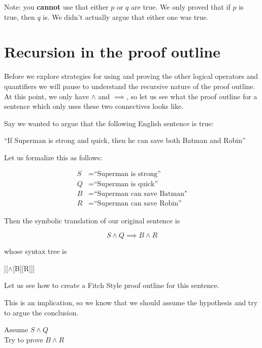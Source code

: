 Note:  you \textbf{cannot} use that either $p$ or $q$ are true.  We only proved that if $p$ is true, then $q$ is.  We didn't actually argue that either one was true.

\newpage

\section{Recursion in the proof outline}

Before we explore strategies for using and proving the other logical operators and quantifiers we will pause to understand the recursive nature of the proof outline.  At this point, we only have $\wedge$ and $\implies$, so let us see what the proof outline for a sentence which only uses these two connectives looks like.

Say we wanted to argue that the following English sentence is true:

\begin{center}
		``If Superman is strong and quick, then he can save both Batman and Robin''
	\end{center}

Let us formalize this as follows:

\begin{align*}
	S &= \textrm{``Superman is strong''}\\
	Q&= \textrm{``Superman is quick''}\\
	B &= \textrm{``Superman can save Batman"}\\
	R &= \textrm{``Superman can save Robin''}
\end{align*}

Then the symbolic translation of our original sentence is

$$
S \wedge Q \implies B \wedge R
$$

whose syntax tree is

\begin{center}
\begin{forest}
	[$\implies$[$\wedge$[S][Q]][$\wedge$[B][R]]]
	\end{forest}
\end{center}

Let us see how to create a Fitch Style proof outline for this sentence.

This is an implication, so we know that we should assume the hypothesis and try to argue the conclusion.

\begin{fitch*}
	\textrm{Assume $S \wedge Q$}\\
	\fa \textrm{Try to prove $B \wedge R$}
	\end{fitch*}

